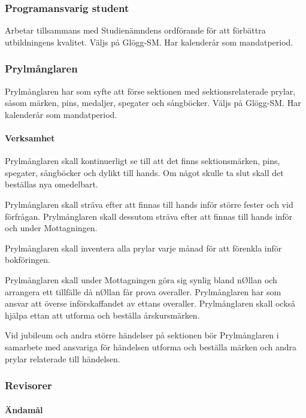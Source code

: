 \documentclass{dgovdoc}
\begin{document}
\subsubsection{Programansvarig student}

Arbetar tillsammans med Studienämndens ordförande för att förbättra
utbildningens kvalitet. Väljs på Glögg-SM. Har kalenderår som mandatperiod.

\subsubsection{Prylmånglaren}

Prylmånglaren har som syfte att förse sektionen med sektionsrelaterade prylar,
såsom märken, pins, medaljer, spegater och sångböcker. Väljs på Glögg-SM. Har
kalenderår som mandatperiod.

\paragraph{Verksamhet}

Prylmånglaren skall kontinuerligt se till att det finns sektionsmärken, pins,
spegater, sångböcker och dylikt till hands. Om något skulle ta slut skall det
beställas nya omedelbart.

Prylmånglaren skall sträva efter att finnas till hands inför större fester och
vid förfrågan. Prylmånglaren skall dessutom sträva efter att finnas till hands
inför och under Mottagningen.

Prylmånglaren skall inventera alla prylar varje månad för att förenkla inför
bokföringen.

Prylmånglaren skall under Mottagningen göra sig synlig bland nØllan och
arrangera ett tillfälle då nØllan får prova overaller. Prylmånglaren har som
ansvar att överse införskaffandet av ettans overaller. Prylmånglaren skall
också hjälpa ettan att utforma och beställa årskursmärken.

Vid jubileum och andra större händelser på sektionen bör Prylmånglaren i
samarbete med ansvariga för händelsen utforma och beställa märken och andra
prylar relaterade till händelsen.

\subsubsection{Revisorer}

\paragraph{Ändamål}
\end{document}
